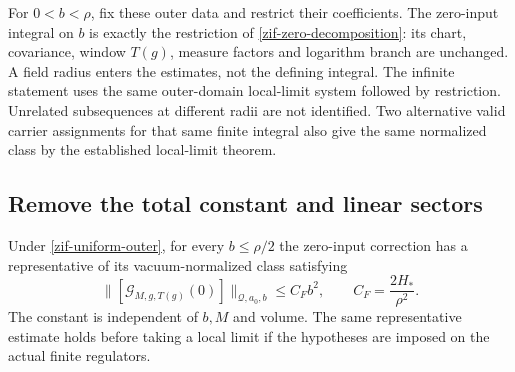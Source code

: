 For $0<b<\rho$, fix these outer data and restrict their
coefficients. The zero-input integral on $b$ is exactly the
restriction of \eqref{zif-zero-decomposition}: its chart,
covariance, window $T(g)$, measure factors and logarithm branch
are unchanged. A field radius enters the estimates, not the
defining integral. The infinite statement uses the same
outer-domain local-limit system followed by restriction.
Unrelated subsequences at different radii are not identified.
Two alternative valid carrier assignments for that same finite
integral also give the same normalized class by the established
local-limit theorem.

\subsection{Remove the total constant and linear sectors}
\label{zif-force-section}

\begin{theorem}
\label{zif-theorem}
Under \eqref{zif-uniform-outer}, for every $b\le\rho/2$ the
zero-input correction has a representative of its
vacuum-normalized class satisfying
\begin{equation}
 \|[\mathcal G_{M,g,T(g)}(0)]\|_{\mathcal Q,a_0,b}
       \le C_F b^2,
 \qquad C_F=\frac{2H_*}{\rho^2}.
 \label{zif-force-bound}
\end{equation}
The constant is independent of $b,M$ and volume. The same
representative estimate holds before taking a local limit if
the hypotheses are imposed on the actual finite regulators.
\end{theorem}

